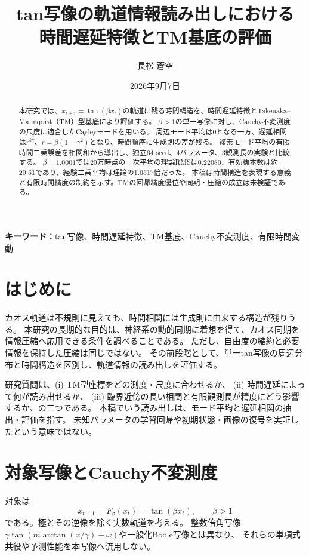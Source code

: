 \documentclass[a4paper,11pt]{jlreq}
\title{tan写像の軌道情報読み出しにおける\\時間遅延特徴とTM基底の評価}
\author{長松 蒼空}
\date{2026年9月7日}
\begin{document}
\maketitle
\begin{abstract}
本研究では、$x_{t+1}=\tan(\beta x_t)$の軌道に残る時間構造を、時間遅延特徴とTakenaka--Malmquist（TM）型基底により評価する。
$\beta>1$の単一写像に対し、Cauchy不変測度の尺度に適合したCayleyモードを用いる。
周辺モード平均は0となる一方、遅延相関は$r^{k\tau}$、$r=\beta(1-\gamma^2)$となり、時間順序に生成則の差が残る。
複素モード平均の有限時間二乗誤差を相関和から導出し、独立64 seed、4パラメータ、3観測長の実験と比較する。
$\beta=1.0001$では20万時点の一次平均の理論RMSは0.22080、有効標本数は約20.51であり、経験二乗平均は理論の1.0517倍だった。
本稿は時間構造を表現する意義と有限時間精度の制約を示す。TMの回帰精度優位や同期・圧縮の成立は未検証である。
\end{abstract}
\noindent\textbf{キーワード：}tan写像、時間遅延特徴、TM基底、Cauchy不変測度、有限時間変動

\section{はじめに}
カオス軌道は不規則に見えても、時間相関には生成則に由来する構造が残りうる。
本研究の長期的な目的は、神経系の動的同期に着想を得て、カオス同期を情報圧縮へ応用できる条件を調べることである。
ただし、自由度の縮約と必要情報を保持した圧縮は同じではない。
その前段階として、単一tan写像の周辺分布と時間構造を区別し、軌道情報の読み出しを評価する。

研究質問は、(i) TM型座標をどの測度・尺度に合わせるか、
(ii) 時間遅延によって何が読み出せるか、
(iii) 臨界近傍の長い相関と有限観測長が精度にどう影響するか、の三つである。
本稿でいう読み出しは、モード平均と遅延相関の抽出・評価を指す。
未知パラメータの学習回帰や初期状態・画像の復号を実証したという意味ではない。

\section{対象写像とCauchy不変測度}
対象は
\begin{equation}
x_{t+1}=F_\beta(x_t)=\tan(\beta x_t),\qquad \beta>1
\label{eq:tan}
\end{equation}
である。極とその逆像を除く実数軌道を考える。
整数倍角写像$\gamma\tan(m\arctan(x/\gamma)+\omega)$や一般化Boole写像とは異なり、
それらの単項式共役や予測性能を本写像へ流用しない。
\end{document}
